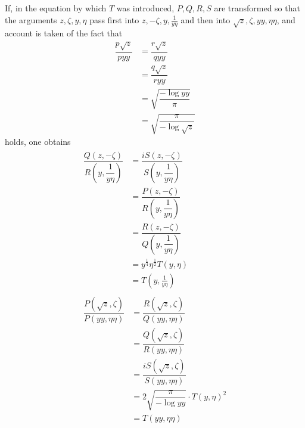 If, in the equation by which $T$ was introduced, $P,\allowbreak Q,\allowbreak R,\allowbreak S$ are transformed so that the arguments $z,\allowbreak \zeta,\allowbreak y,\allowbreak \eta$ pass first into $z,\allowbreak -\zeta,\allowbreak y,\allowbreak \frac{1}{y\eta}$ and then into $\surd  z,\allowbreak \zeta,\allowbreak yy,\allowbreak \eta\eta$, and account is taken of the fact that
\[
\begin{aligned}\dfrac{p\surd  z}{pyy}&=\dfrac{r\surd  z}{qyy}\\[7pt]&=\dfrac{q\surd  z}{ryy}\\[7pt]&=\surd {\dfrac{-\log yy}{\pi}}\\[7pt]&=\surd {\dfrac{\pi}{-\log\surd  z}}\end{aligned}
\]
holds, one obtains
\[
\begin{gathered}\begin{aligned}\dfrac{Q(z,-\zeta)}{R(y,\dfrac{1}{y\eta})}&=\dfrac{iS(z,-\zeta)}{S(y,\dfrac{1}{y\eta})}\\[7pt]&=\dfrac{P(z,-\zeta)}{R(y,\dfrac{1}{y\eta})}\\[7pt]&=\dfrac{R(z,-\zeta)}{Q(y,\dfrac{1}{y\eta})}\\[7pt]&=y^{\frac14}\eta^{\frac12}T(y,\eta)\\[7pt]&=T(y,\tfrac{1}{y\eta})\end{aligned}\\[10pt]\begin{aligned}\dfrac{P(\surd  z,\zeta)}{P(yy,\eta\eta)}&=\dfrac{R(\surd  z,\zeta)}{Q(yy,\eta\eta)}\\[7pt]&=\dfrac{Q(\surd  z,\zeta)}{R(yy,\eta\eta)}\\[7pt]&=\dfrac{iS(\surd  z,\zeta)}{S(yy,\eta\eta)}\\[7pt]&=2\surd {\dfrac{\pi}{-\log yy}}\cdot T(y,\eta)^2\\[7pt]&=T(yy,\eta\eta)\end{aligned}\end{gathered}
\]



